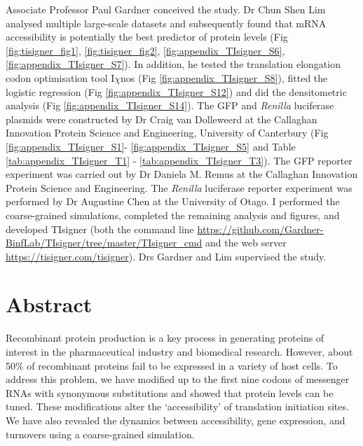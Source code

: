 Associate Professor Paul Gardner conceived the study. Dr Chun Shen Lim analysed multiple large-scale datasets and subsequently found that mRNA accessibility is potentially the best predictor of protein levels (Fig \ref{fig:tisigner_fig1}, \ref{fig:tisigner_fig2}, \ref{fig:appendix_TIsigner_S6}, \ref{fig:appendix_TIsigner_S7}). In addition, he tested the translation elongation codon optimisation tool I$\chi$nos (Fig \ref{fig:appendix_TIsigner_S8}), fitted the logistic regression  (Fig \ref{fig:appendix_TIsigner_S12}) and did the densitometric analysis (Fig \ref{fig:appendix_TIsigner_S14}). The GFP and \textit{Renilla} luciferase plasmids were constructed by Dr Craig van Dolleweerd at the Callaghan Innovation Protein Science and Engineering, University of Canterbury (Fig \ref{fig:appendix_TIsigner_S1}- \ref{fig:appendix_TIsigner_S5} and Table \ref{tab:appendix_TIsigner_T1} - \ref{tab:appendix_TIsigner_T3}). The GFP reporter experiment was carried out by Dr Daniela M. Remus at the Callaghan Innovation Protein Science and Engineering. The \textit{Renilla} luciferase reporter experiment was performed by Dr Augustine Chen at the University of Otago. I performed the coarse-grained simulations, completed the remaining analysis and figures, and developed TIsigner (both the command line \href{https://github.com/Gardner-BinfLab/TIsigner/tree/master/TIsigner\_cmd}{https://github.com/Gardner-BinfLab/TIsigner/tree/master/TIsigner\_cmd} and the web server \href{https://tisigner.com/tisigner}{https://tisigner.com/tisigner}). Drs Gardner and Lim supervised the study.

\section{Abstract}
Recombinant protein production is a key process in generating proteins of interest in the pharmaceutical industry and biomedical research. However, about 50\% of recombinant proteins fail to be expressed in a variety of host cells. To address this problem, we have modified up to the first nine codons of messenger RNAs with synonymous substitutions and showed that protein levels can be tuned. These modifications alter the ‘accessibility’ of translation initiation sites. We have also revealed the dynamics between accessibility, gene expression, and turnovers using a coarse-grained simulation.

